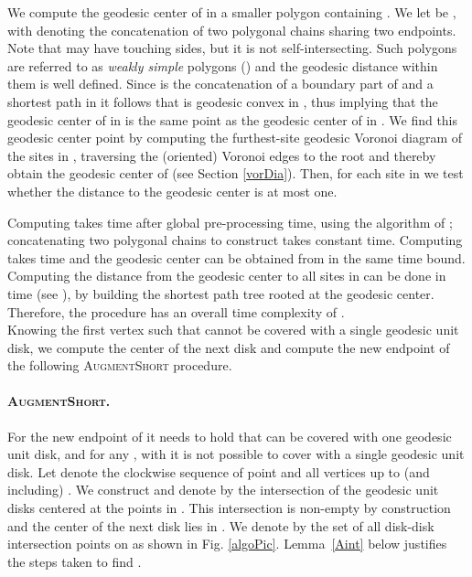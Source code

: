 \documentclass{llncs}
\begin{document}
 We compute the geodesic center of  in a smaller polygon  containing . We let  be , with  denoting the concatenation of two polygonal chains sharing two endpoints. Note that  may have touching sides, but it is not self-intersecting. Such polygons are referred to as \emph{weakly simple} polygons (\cite{Dumitrescu2009112}) and the geodesic distance within them is well defined. Since  is the concatenation of a boundary part of  and a shortest path in  it follows that  is geodesic convex in , thus implying that the geodesic center of  in  is the same point as the geodesic center of  in . We find this geodesic center point by computing the furthest-site geodesic Voronoi diagram  of the sites  in , traversing the (oriented) Voronoi edges to the root and thereby obtain the geodesic center of  (see Section \ref{vorDia}). Then, for each site in  we test whether the distance to the geodesic center is at most one. 

  Computing  takes time  after  global pre-processing time, using the algorithm of \cite{Guibas1989126}; concatenating two polygonal chains to construct  takes constant time. Computing  takes  time and the geodesic center can be obtained from  in the same time bound. Computing the distance from the geodesic center to all sites in  can be done in time  (see \cite{lineshortpath}), by building the shortest path tree rooted at the geodesic center. 
Therefore, the procedure has an overall time complexity of . \\


Knowing the first vertex  such that  cannot be covered with a single geodesic unit disk, we compute the center of the next disk and compute the new endpoint  of  the following \textsc{AugmentShort} procedure.

\paragraph{\textbf{\textsc{AugmentShort}.}}
For the new endpoint  of  it needs to hold that  can be covered with one geodesic unit disk, and for any , with  it is not possible to cover  with a single geodesic unit disk. 
Let  denote the clockwise sequence of point  and all vertices up to (and including) . We construct  and denote by  the intersection of the geodesic unit disks centered at the points  in . This intersection is non-empty by construction and the center of the next disk lies in . We denote by  the set of all disk-disk intersection points on  as shown in Fig. \ref{algoPic}. { Lemma~\ref{Aint} below justifies the steps taken to find }.
\end{document}
